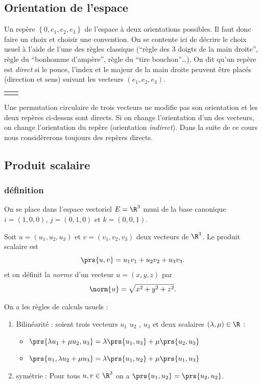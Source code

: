 \subsection{Orientation de l'espace}

Un repère $\left\{ 0,e_1,e_2,e_3 \right\}$ de l'espace à deux orientations possibles. Il faut donc faire un choix et choisir une convention. On se contente ici de décrire le choix usuel à l'aide de l'une des règles classique (``règle des 3 doigts de la main droite'', règle du ``bonhomme d'ampère'', règle du ``tire bouchon''\ldots). On dit qu'un repère est \emph{direct} si le pouce, l'index et le majeur de la main droite peuvent être placés (direction et sens) suivant les vecteurs $(e_1,e_2,e_3)$.
\begin{center}
	\begin{tabular}{cc}
		 & 
		
	\end{tabular}
\end{center}
Une permutation circulaire de trois vecteurs ne modifie pas son orientation et les deux repères ci-dessus sont directs. Si on change l'orientation d'un des vecteurs, on change l'orientation du repère (orientation \emph{indirect}). Dans la suite de ce cours nous considèrerons toujours des repères directs.

\subsection{Produit scalaire}

\subsubsection{définition}
On se place dans l'espace vectoriel $E = \R^3$ muni de la base canonique $i = (1,0,0)$, $j=(0,1,0)$ et $k=(0,0,1)$. 

\begin{definition}
	Soit $u =(u_1,u_2,u_3)$ et $v=(v_1,v_2,v_3)$ deux vecteurs de $\R^3$. Le produit scalaire est \[
		\prs{u,v} = u_1v_1 + u_2v_2 + u_3v_3.
	\]
et on définit la \emph{norme} d'un vecteur $u=(x,y,z)$ par
\[
	\norm{u}  = \sqrt{x^2+y^2+z^2}.
\]
\end{definition}

On a les règles de calculs usuels :
\begin{proposition}
	\begin{enumerate}
		\item Bilinéarité : soient trois vecteurs $u_1$ $u_2$ , $u_3$ et deux scalaires $(\lambda,\mu)\in \R$ :
			\begin{itemize}
				\item  $\prs{\lambda u_1 + \mu u_2, u_3} = \lambda \prs{u_1,u_3} + \mu \prs{u_2,u_3} $
				\item $\prs{u_1,\lambda u_2 + \mu u_3} = \lambda \prs{u_1,u_2} + \mu \prs{u_1,u_3} $ 
			\end{itemize}
		\item symétrie : Pour tous $u,v\in\R^3$ on a $\prs{u_1,u_2} = \prs{u_2,u_2}$.
	\end{enumerate}
\end{proposition}

